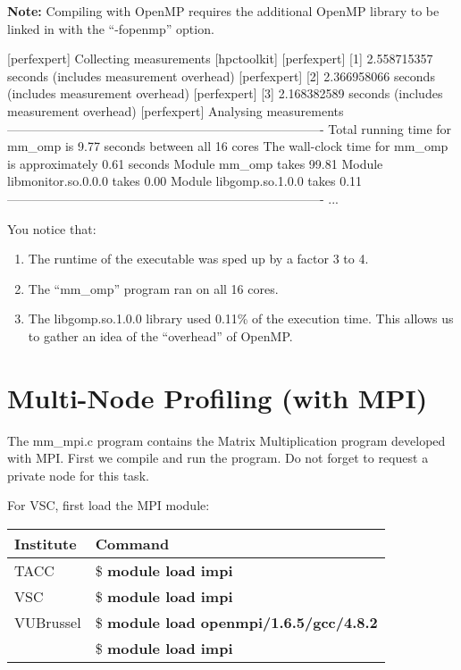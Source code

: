 \textbf{Note:} Compiling with OpenMP requires the additional OpenMP library to be linked in with the ``-fopenmp'' option.

\begin{prompt}
[perfexpert] Collecting measurements [hpctoolkit]
[perfexpert]    [1] 2.558715357 seconds (includes measurement overhead)
[perfexpert]    [2] 2.366958066 seconds (includes measurement overhead)
[perfexpert]    [3] 2.168382589 seconds (includes measurement overhead)
[perfexpert] Analysing measurements
----------------------------------------------------------------------------
Total running time for mm_omp is 9.77 seconds between all 16 cores
The wall-clock time for mm_omp is approximately 0.61 seconds
Module mm_omp takes 99.81%
Module libmonitor.so.0.0.0 takes 0.00%
Module libgomp.so.1.0.0 takes 0.11%
----------------------------------------------------------------------------
...
\end{prompt}

You notice that:
\begin{enumerate}
  \item  The runtime of the executable was sped up by a factor 3 to 4.
  \item  The ``mm\_omp'' program ran on all 16 cores.
  \item  The libgomp.so.1.0.0 library used 0.11\% of the execution time. This allows us to gather an idea of the ``overhead'' of OpenMP.
\end{enumerate}

\section{Multi-Node Profiling (with MPI)}
\label{sec:Multi_node_profiling_MPI}

The mm\_mpi.c program contains the Matrix Multiplication program developed with MPI. First we compile and run the program. Do not forget to request a private node for this task.

For VSC, first load the MPI module:

\begin{prompt}
\end{prompt}

\begin{tabular}{|p{}|p{}|} \hline
\textbf{Institute}          & \textbf{Command} \\ \hline
TACC                        & \$ \textbf{module load impi} \\ \hline
VSC                         & \$ \textbf{module load impi} \\ \hline
VUBrussel                   & \$ \textbf{module load openmpi/1.6.5/gcc/4.8.2} \\
                            & \$ \textbf{module load impi} \\ \hline
\end{tabular}


